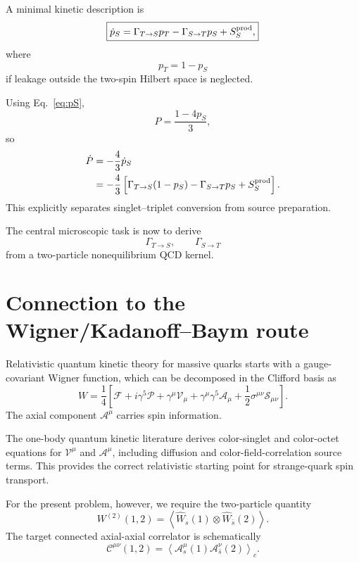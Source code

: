 \documentclass[11pt]{article}
\begin{document}
A minimal kinetic description is
\begin{equation}
\boxed{
\dot p_S
=
\Gamma_{T\rightarrow S}p_T
-
\Gamma_{S\rightarrow T}p_S
+
S_S^{\rm prod},
}
\label{eq:rate}
\end{equation}
where
\begin{equation}
p_T=1-p_S
\end{equation}
if leakage outside the two-spin Hilbert space is neglected.

Using Eq.~\eqref{eq:pS},
\begin{equation}
P=\frac{1-4p_S}{3},
\end{equation}
so
\begin{align}
\dot P
&=
-\frac43\dot p_S\\
&=
-\frac43
\left[
\Gamma_{T\to S}(1-p_S)
-\Gamma_{S\to T}p_S
+S_S^{\rm prod}
\right].
\end{align}
This explicitly separates singlet--triplet conversion from source preparation.

The central microscopic task is now to derive
\begin{equation}
\Gamma_{T\to S},
\qquad
\Gamma_{S\to T}
\end{equation}
from a two-particle nonequilibrium QCD kernel.

\section{Connection to the Wigner/Kadanoff--Baym route}

Relativistic quantum kinetic theory for massive quarks starts with a gauge-covariant Wigner function,
which can be decomposed in the Clifford basis as
\begin{equation}
W
=
\frac14
\left[
\mathcal F
+i\gamma^5\mathcal P
+\gamma^\mu\mathcal V_\mu
+\gamma^\mu\gamma^5\mathcal A_\mu
+\frac12\sigma^{\mu\nu}\mathcal S_{\mu\nu}
\right].
\end{equation}
The axial component $\mathcal A^\mu$ carries spin information.

The one-body quantum kinetic literature derives color-singlet and color-octet equations for
$\mathcal V^\mu$ and $\mathcal A^\mu$, including diffusion and color-field-correlation source terms.
This provides the correct relativistic starting point for strange-quark spin transport.

For the present problem, however, we require the two-particle quantity
\begin{equation}
W^{(2)}(1,2)
=
\left\langle
\widehat W_s(1)\otimes
\widehat W_{\bar s}(2)
\right\rangle.
\end{equation}
The target connected axial-axial correlator is schematically
\begin{equation}
\mathcal C^{\mu\nu}(1,2)
=
\left\langle
\mathcal A_s^\mu(1)
\mathcal A_{\bar s}^\nu(2)
\right\rangle_c.
\end{equation}
\end{document}
